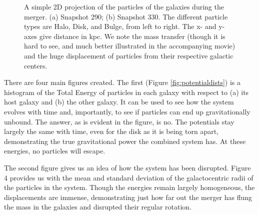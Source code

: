 \documentclass[linenumbers, ]{aastex631}
\begin{document}
\begin{figure}[ht!]
\centering
      
      
\caption{\label{fig:2dproj} A simple 2D projection of the particles of the galaxies during the merger. (a) Snapshot 290; (b) Snapshot 330. The different particle types are Halo, Disk, and Bulge, from left to right. The x- and y-axes give distance in kpc. We note the mass transfer (though it is hard to see, and much better illustrated in the accompanying movie) and the huge displacement of particles from their respective galactic centers.}
\end{figure}

There are four main figures created. The first (Figure \ref{fig:potentialdists}) is a histogram of the Total Energy of particles in each galaxy with respect to (a) its host galaxy and (b) the other galaxy. It can be used to see how the system evolves with time and, importantly, to see if particles can end up gravitationally unbound. The answer, as is evident in the figure, is no. The potentials stay largely the same with time, even for the disk as it is being torn apart, demonstrating the true gravitational power the combined system has. At these energies, no particles will escape.

The second figure gives us an idea of how the system has been disrupted. Figure 4 provides us with the mean and standard deviation of the galactocentric radii of the particles in the system. Though the energies remain largely homogeneous, the displacements are immense, demonstrating just how far out the merger has flung the mass in the galaxies and disrupted their regular rotation.
\end{document}
